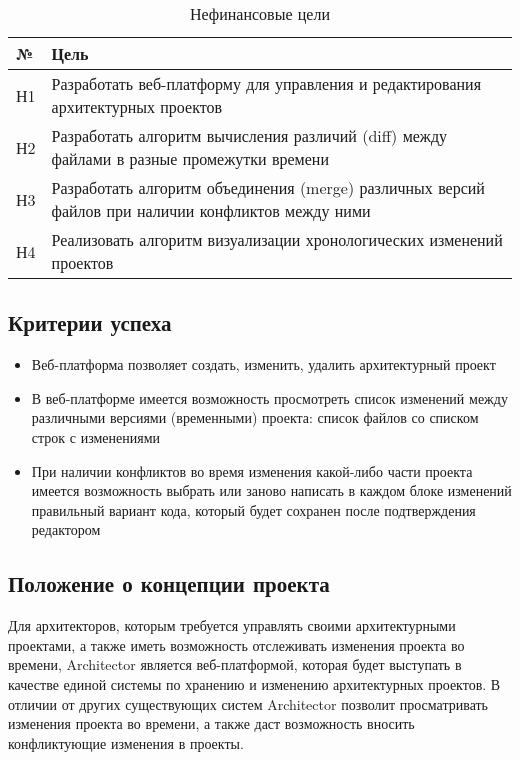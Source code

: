 \documentclass[a4paper,14pt]{extreport} %
\begin{document}
\begin{table}
\caption {Нефинансовые цели} \label{tab:title}
\begin{center}
\begin{tabular}{ | l | p{14cm} | }
\hline
№ & Цель \\
\hline
Н1 & Разработать веб-платформу для управления и редактирования 	архитектурных проектов \\
\hline
Н2 & Разработать алгоритм вычисления различий (diff) между файлами в разные промежутки времени \\
\hline
Н3 & Разработать алгоритм объединения (merge) различных версий файлов при наличии конфликтов между ними \\
\hline
Н4 & Реализовать алгоритм визуализации хронологических изменений проектов \\
\hline
\end{tabular}
\end{center}
\end{table}
 
 
\subsection{Критерии успеха}

\begin{itemize}
\item Веб-платформа позволяет создать, изменить, удалить архитектурный проект
\item В веб-платформе имеется возможность просмотреть список изменений между различными версиями (временными) проекта: список файлов со списком строк с изменениями
\item При наличии конфликтов во время изменения какой-либо части проекта имеется возможность выбрать или заново написать в каждом блоке изменений правильный вариант кода, который будет сохранен после подтверждения редактором
\end {itemize}
 
 
 \subsection{Положение о концепции проекта}
 
Для архитекторов, которым требуется управлять своими архитектурными проектами, а также иметь возможность отслеживать изменения проекта во времени, Architector является веб-платформой, которая будет выступать в качестве единой системы по хранению и изменению архитектурных проектов. В отличии от других существующих систем Architector позволит  просматривать изменения проекта во времени, а также даст возможность вносить конфликтующие изменения в проекты.
\end{document}
